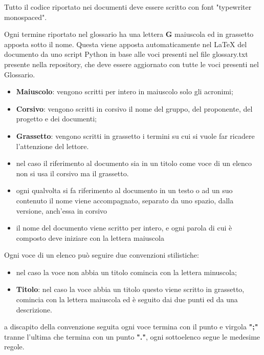 	    Tutto il codice riportato nei documenti deve essere scritto con font "typewriter monospaced".
	    
	    Ogni termine riportato nel glossario ha una lettera \textbf{G} maiuscola ed in grassetto apposta sotto il nome. Questa viene apposta automaticamente nel LaTeX del documento da uno script Python in base alle voci presenti nel file glossary.txt presente nella repository, che deve essere aggiornato con tutte le voci presenti nel Glossario.
	    
	    \begin{itemize}
	        \item \textbf{Maiuscolo}: vengono scritti per intero in maiuscolo solo gli acronimi;
	        \item \textbf{Corsivo}: vengono scritti in corsivo il nome del gruppo, del proponente, del progetto e dei documenti;
	        \item \textbf{Grassetto}: vengono scritti in grassetto i termini su cui si vuole far ricadere l'attenzione del lettore.
	    \end{itemize}
	    
	    \begin{itemize}
	        \item nel caso il riferimento al documento sia in un titolo come voce di un elenco non si usa il corsivo ma il grassetto.
	        \item ogni qualvolta si fa riferimento al documento in un testo o ad un suo contenuto il nome viene accompagnato, separato da uno spazio, dalla versione, anch'essa in corsivo
	        \item il nome del documento viene scritto per intero, e ogni parola di cui è composto deve iniziare con la lettera maiuscola
	    \end{itemize}
	    
	    Ogni voce di un elenco può seguire due convenzioni stilistiche:
	    \begin{itemize}
	        \item nel caso la voce non abbia un titolo comincia con la lettera minuscola;
	        \item \textbf{Titolo}: nel caso la voce abbia un titolo questo viene scritto in grassetto, comincia con la lettera maiuscola ed è seguito dai due punti ed da una descrizione.
	    \end{itemize}
	    a discapito della convenzione seguita ogni voce termina con il punto e virgola \textbf{";"} tranne l'ultima che termina con un punto \textbf{"."}, ogni sottoelenco 
	    segue le medesime regole.
	    
